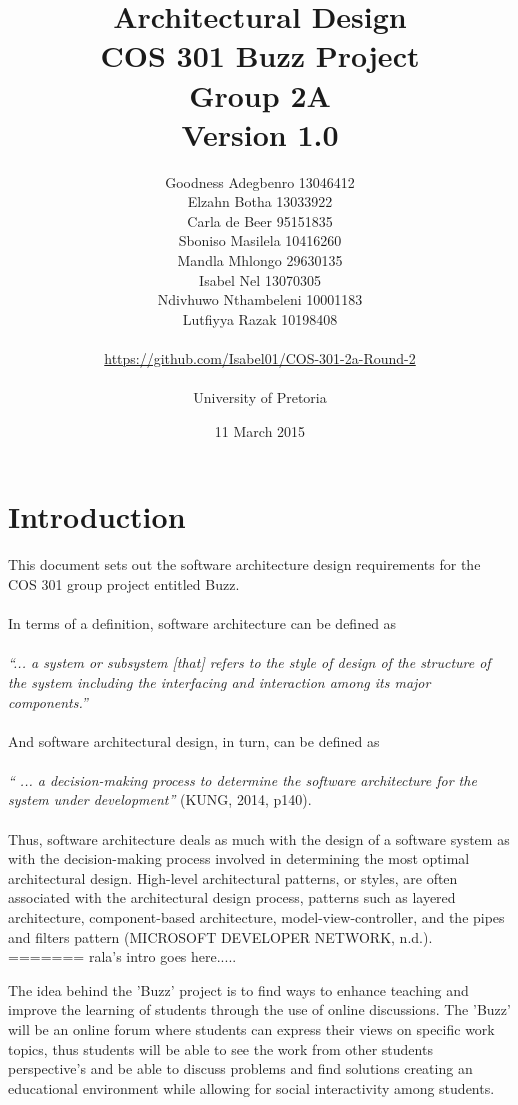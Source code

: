 \documentclass[a4paper]{article}
\title{Architectural Design
\\COS 301 Buzz Project
\\Group 2A
\\Version 1.0}
\author{Goodness Adegbenro 13046412
\\Elzahn Botha 13033922
\\Carla de Beer 95151835
\\Sboniso Masilela 10416260
\\Mandla Mhlongo 29630135
\\Isabel Nel 13070305
\\Ndivhuwo Nthambeleni 10001183
\\Lutfiyya Razak 10198408
\\
\\
\url{https://github.com/Isabel01/COS-301-2a-Round-2}
\\
\\ University of Pretoria}
\date{11 March 2015}
\begin{document}
\maketitle
\newpage


\tableofcontents
\newpage

\section{Introduction}
This document sets out the software architecture design requirements for the COS 301 group project entitled Buzz.
\\
\\In terms of a definition, software architecture can be defined as
\\
\\\textit{“... a system or subsystem [that] refers to the style of design of the structure of the system including the interfacing and interaction among its major components.”}
\\
\\And software architectural design, in turn, can be defined as
\\
\\\textit{“ ... a decision-making process to determine the software architecture for the system under development”} (KUNG, 2014, p140).
\\
\\Thus, software architecture deals as much with the design of a software system as with the decision-making process involved in determining the most optimal architectural design.
High-level architectural patterns, or styles, are often associated with the architectural design process, patterns such as layered architecture, component-based architecture, model-view-controller, and the pipes and filters pattern (MICROSOFT DEVELOPER NETWORK, n.d.).
=======
rala's intro goes here.....

The idea behind the 'Buzz' project is to find ways to enhance teaching and improve the learning of students through the use of online discussions. The 'Buzz' will be an online forum where students can express their views on specific work topics, thus students will be able to see the work from other students perspective's and be able to discuss problems and find solutions creating an educational environment while allowing for social interactivity among students.
\end{document}
